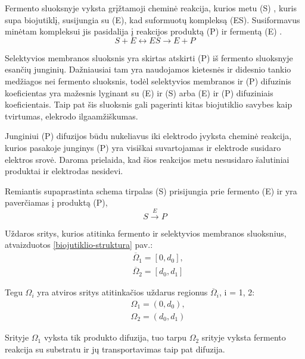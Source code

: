 \documentclass[12pt, a4paper, lithuanian]{article}
\begin{document}
Fermento sluoksnyje vyksta grįžtamoji cheminė reakcija, kurios metu (S)
, kuris supa biojutiklį,
susijungia su (E), kad suformuotų kompleksą (ES). Susiformavus minėtam
kompleksui jis pasidalija į reakcijos produktą (P) ir fermentą (E)
\cite{baronas2009mathematical}.  
\begin{equation}\label{eq:basic} 
    S + E \leftrightarrow ES \rightarrow E + P
\end{equation}

Selektyvios membranos sluoksnis yra skirtas atskirti (P) iš fermento sluoksnyje esančių
junginių. Dažniausiai tam yra naudojamos kietesnės ir didesnio tankio medžiagos
nei fermento sluoksnis, todėl selektyvios membranos ir (P) difuzinis
koeficientas yra mažesnis lyginant su (E) ir (S) arba (E) ir (P) difuziniais
koeficientais. Taip pat šis sluoksnis gali pagerinti kitas biojutiklio savybes kaip
tvirtumas, elekrodo ilgaamžiškumas. 

Junginiui (P) difuzijos būdu nukeliavus iki elektrodo įvyksta cheminė reakcija,
kurios pasakoje junginys (P) yra visiškai suvartojamas ir elektrode susidaro
elektros srovė. Daroma prielaida, kad šios reakcijos metu nesusidaro šalutiniai
produktai ir elektrodas nesidevi.

Remiantis supaprastinta schema tirpalas (S) prisijungia prie fermento (E)
ir yra
paverčiamas į produktą (P),
\begin{equation}\label{eq:basic}
    S \overset{E}{\rightarrow} P
\end{equation}

Uždaros sritys, kurios atitinka fermento ir selektyvios
membranos sluoksnius, atvaizduotos \ref{biojutiklio-struktura} pav.:
\begin{equation}
\begin{aligned}
    &\overline{\Omega}_1 = [0, d_0],\\
    &\overline{\Omega}_2 = [d_0, d_1]
\end{aligned}
\end{equation}

Tegu $\Omega_i$ yra atviros sritys atitinkačios uždarus regionus
$\overline{\Omega}_i$, i = 1, 2:
\begin{equation}
\begin{aligned}
    &\Omega_1 = (0, d_0),\\
    &\Omega_2 = (d_0, d_1)
\end{aligned}
\end{equation}

Srityje $\Omega_1$ vyksta tik produkto
difuzija, tuo tarpu $\Omega_2$ srityje vyksta fermento
reakcija su substratu ir jų transportavimas taip pat difuzija.
\end{document}
